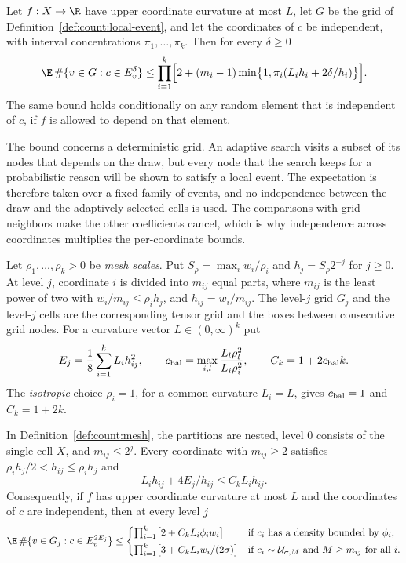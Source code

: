 \begin{theorem}\label{thm:count:local}
Let $f:X\to\R$ have upper coordinate curvature at most $L$, let $G$ be the
grid of Definition~\ref{def:count:local-event}, and let the coordinates of
$c$ be independent, with interval concentrations $\pi_1,\dots,\pi_k$. Then
for every $\delta\ge0$
\[
 \E\,\#\{v\in G: c\in E_v^\delta\}
 \le\prod_{i=1}^k\Bigl[2+(m_i-1)\min\bigl\{1,\pi_i(L_ih_i+2\delta/h_i)\bigr\}\Bigr].
\]
The same bound holds conditionally on any random element that is
independent of $c$, if $f$ is allowed to depend on that element.
\end{theorem}

The bound concerns a deterministic grid. An adaptive search visits a subset
of its nodes that depends on the draw, but every node that the search keeps
for a probabilistic reason will be shown to satisfy a local event. The
expectation is therefore taken over a fixed family of events, and no
independence between the draw and the adaptively selected cells is used.
The comparisons with grid neighbors make the other coefficients cancel, which
is why independence across coordinates multiplies the per-coordinate bounds.

\begin{definition}\label{def:count:mesh}
Let $\rho_1,\dots,\rho_k>0$ be \emph{mesh scales}. Put
$S_\rho=\max_iw_i/\rho_i$ and $h_j=S_\rho2^{-j}$ for $j\ge0$. At level $j$,
coordinate $i$ is divided into $m_{ij}$ equal parts, where $m_{ij}$ is the
least power of two with $w_i/m_{ij}\le\rho_ih_j$, and $h_{ij}=w_i/m_{ij}$.
The level-$j$ grid $G_j$ and the level-$j$ cells are the corresponding
tensor grid and the boxes between consecutive grid nodes. For a curvature
vector $L\in(0,\infty)^k$ put
\[
 E_j=\frac18\sum_{i=1}^kL_ih_{ij}^2,
 \qquad
 c_{\rm bal}=\max_{i,l}\frac{L_l\rho_l^2}{L_i\rho_i^2},
 \qquad
 C_k=1+2c_{\rm bal}k .
\]
The \emph{isotropic} choice $\rho_i=1$, for a common curvature $L_i=L$, gives
$c_{\rm bal}=1$ and $C_k=1+2k$.
\end{definition}

\begin{corollary}\label{cor:count:levels}
In Definition~\ref{def:count:mesh}, the partitions are nested, level $0$
consists of the single cell $X$, and $m_{ij}\le2^j$. Every coordinate with
$m_{ij}\ge2$ satisfies $\rho_ih_j/2<h_{ij}\le\rho_ih_j$ and
\[
 L_ih_{ij}+4E_j/h_{ij}\le C_kL_ih_{ij}.
\]
Consequently, if $f$ has upper coordinate curvature at most $L$ and the
coordinates of $c$ are independent, then at every level $j$
\[
 \E\,\#\{v\in G_j:c\in E_v^{2E_j}\}\le
 \begin{cases}
 \prod_{i=1}^k\bigl[2+C_kL_i\phi_iw_i\bigr]
 &\text{if $c_i$ has a density bounded by $\phi_i$,}\\[3pt]
 \prod_{i=1}^k\bigl[3+C_kL_iw_i/(2\sigma)\bigr]
 &\text{if $c_i\sim\mathcal U_{\sigma,M}$ and $M\ge m_{ij}$ for all $i$.}
 \end{cases}
\]
\end{corollary}

